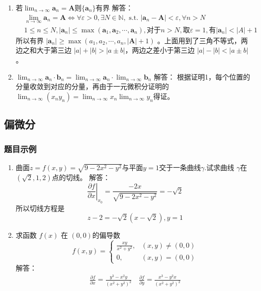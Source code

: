 \begin{enumerate}
\begin{enumerate}[(1)]
    \item 若$\lim _{n\to \infty} \mathbf{a}_n = \mathbf{A}$则$\{ \mathbf{a}_n \}$有界
    解答：
    \begin{align*}
        & \lim _{n\to \infty} \mathbf{a}_n = \mathbf{A} \Leftrightarrow \forall \varepsilon>0,\exists N \in \mathbb{N},\text{ s.t. }|\mathbf{a}_n - \mathbf{A}|< \varepsilon, \forall n > N \\
        & 1 \le n \le N, |\mathbf{a}_n| \le \max(\mathbf{a}_1, \mathbf{a}_2, \cdots, \mathbf{a}_n), \text{对于} n > N , \text{取} \varepsilon=1, \text{有} |\mathbf{a}_n| < |A|+1
    \end{align*}
    所以有界 $|\mathbf{a}_n| \ge \max(a_1, a_2, \cdots ,a_n, |\mathbf{A}|+1)$ 。上面用到了三角不等式，两边之和大于第三边 $|a|+|b|>|a \pm b|$，两边之差小于第三边 $|a|-|b| < |a \pm b|$。
    
    \item $\lim _{n\to \infty} \mathbf{a}_n \cdot \mathbf{b}_n = \lim _{n\to \infty} \mathbf{a}_n \cdot \lim _{n\to \infty} \mathbf{b}_n $
    解答：
    根据证明1，每个位置的分量收敛到对应的分量，再由于一元微积分证明的 $\lim_{n\to \infty} (x_n y_n) = \lim_{n\to \infty} x_n \lim_{n\to \infty} y_n  $得证。
    \end{enumerate}

\end{enumerate}

\subsection{偏微分}
\subsubsection{题目示例}
\begin{enumerate}
\item 曲面$z=f(x,y)=\sqrt{9-2x^2-y^2}$与平面$y=1$交于一条曲线$\gamma.$试求曲线
$\gamma$在$(\sqrt2,1,2)$点的切线。
解答：
\begin{equation*}
\left. \frac{\partial f}{\partial x}  \right|_{x_0}  = \frac{-2x}{\sqrt{9-2x^2-y^2}} = - \sqrt{2}
\end{equation*}
所以切线方程是
\begin{equation*}
    z-2 = -\sqrt{2}(x-\sqrt{2}), y=1
\end{equation*}


\item 求函数 $f(x)$ 在 $(0,0)$的偏导数
$$
f(x,y)=\begin{cases}\frac{xy}{x^2+y^2},&(x,y)\neq(0,0)\\0,&(x,y)=(0,0) \end{cases}
$$
解答：
\begin{align*}
    \frac{\partial f }{\partial x} = \frac{y^3 - x^2y}{(x^2+y^2)^2} \quad
    \frac{\partial f }{\partial y} = \frac{x^3 - y^2x}{(x^2+y^2)^2}
\end{align*}

\end{enumerate}
